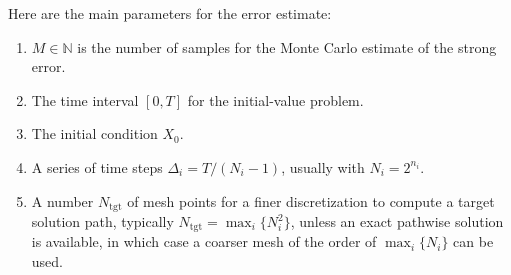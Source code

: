 \documentclass[reqno,12pt]{amsart}
\theoremstyle{plain} %
\theoremstyle{definition} %
\begin{document}
Here are the main parameters for the error estimate:
\begin{enumerate}
    \item $M\in\mathbb{N}$ is the number of samples for the Monte Carlo estimate of the strong error.
    \item The time interval $[0, T]$ for the initial-value problem.
    \item The initial condition $X_0$.
    \item A series of time steps $\Delta_i = T/(N_i-1)$, usually with $N_i=2^{n_i}$.
    \item A number $N_{\mathrm{tgt}}$ of mesh points for a finer discretization to compute a target solution path, typically $N_{\mathrm{tgt}} = \max_i\{N_i^2\}$, unless an exact pathwise solution is available, in which case a coarser mesh of the order of $\max_i\{N_i\}$ can be used.
\end{enumerate}
\end{document}
